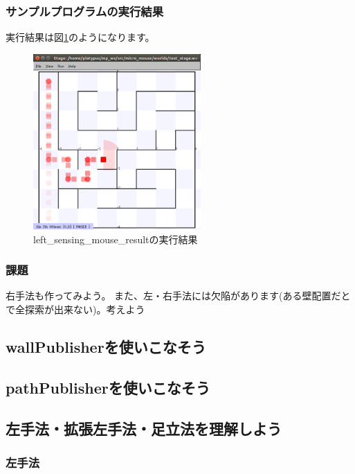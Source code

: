 \documentclass[11pt,a4paper]{jsarticle}
\begin{document}
\subsubsection{サンプルプログラムの実行結果}
実行結果は図\ref{left_sensing_mouse_result}のようになります。
\begin{figure}[h]
  \begin{center}
    \includegraphics[width=64mm]{./left_sensing_mouse_result.png}
  \end{center}
  \label{left_sensing_mouse_result}
  \caption{left\_sensing\_mouse\_resultの実行結果}
\end{figure}

\subsubsection{課題}
右手法も作ってみよう。
また、左・右手法には欠陥があります(ある壁配置だとで全探索が出来ない)。考えよう


\newpage
\subsection{wallPublisherを使いこなそう}




\newpage
\subsection{pathPublisherを使いこなそう}




\newpage
\subsection{左手法・拡張左手法・足立法を理解しよう}
\subsubsection{左手法}

\end{document}
